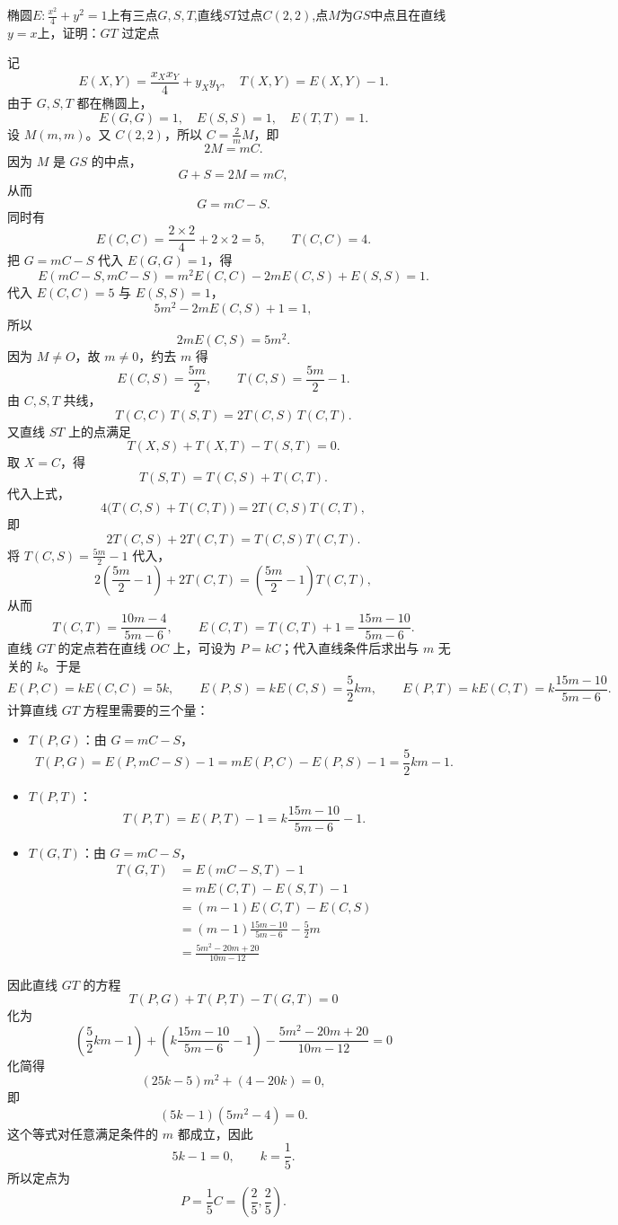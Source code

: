\begin{exercise}
椭圆$E:\frac{x^2}4+y^2=1$上有三点$G,S,T$,直线$ST$过点$C(2,2)$,点$M$为$GS$中点且在直线$y=x$上，证明：$GT$ 过定点
\end{exercise}
\begin{solution}
记
$$E(X, Y) = \frac{x_X x_Y}{4} + y_X y_Y, \quad T(X, Y) = E(X, Y) - 1.$$
由于 $G,S,T$ 都在椭圆上，
$$E(G,G)=1, \quad E(S,S)=1, \quad E(T,T)=1.$$
设 $M(m,m)$。又 $C(2,2)$，所以 $C=\frac{2}{m}M$，即
$$2M=mC.$$
因为 $M$ 是 $GS$ 的中点，
$$G+S=2M=mC,$$
从而
$$G=mC-S.$$
同时有
$$E(C,C)=\frac{2 \times 2}{4}+2 \times 2=5,\qquad T(C,C)=4.$$
把 $G=mC-S$ 代入 $E(G,G)=1$，得
$$E(mC-S,mC-S)=m^2E(C,C)-2mE(C,S)+E(S,S)=1.$$
代入 $E(C,C)=5$ 与 $E(S,S)=1$，
$$5m^2-2mE(C,S)+1=1,$$
所以
$$2mE(C,S)=5m^2.$$
因为 $M \neq O$，故 $m\neq 0$，约去 $m$ 得
$$E(C,S)=\frac{5m}{2},\qquad T(C,S)=\frac{5m}{2}-1.$$
由 $C,S,T$ 共线，
$$T(C,C)\,T(S,T)=2T(C,S)\,T(C,T).$$
又直线 $ST$ 上的点满足
$$T(X,S)+T(X,T)-T(S,T)=0.$$
取 $X=C$，得
$$T(S,T)=T(C,S)+T(C,T).$$
代入上式，
$$4\bigl(T(C,S)+T(C,T)\bigr)=2T(C,S)T(C,T),$$
即
$$2T(C,S)+2T(C,T)=T(C,S)T(C,T).$$
将 $T(C,S)=\frac{5m}{2}-1$ 代入，
$$2 \left( \frac{5m}{2} - 1 \right) + 2 T(C,T) = \left( \frac{5m}{2} - 1 \right) T(C,T),$$
从而
$$T(C,T)=\frac{10m - 4}{5m - 6},\qquad E(C,T)=T(C,T)+1=\frac{15m - 10}{5m - 6}.$$
直线 $GT$ 的定点若在直线 $OC$ 上，可设为 $P=kC$；代入直线条件后求出与 $m$ 无关的 $k$。于是
\[E(P,C) = kE(C,C) = 5k,\qquad E(P,S) = kE(C,S) = \frac{5}{2}km,\qquad E(P,T) = kE(C,T) = k\frac{15m-10}{5m-6}.\]
计算直线 $GT$ 方程里需要的三个量：
\begin{itemize}
\item $T(P,G)$：由 $G=mC-S$，
$$T(P,G)=E(P,mC-S)-1=mE(P,C)-E(P,S)-1=\frac{5}{2}km-1.$$
\item $T(P,T)$：
$$T(P,T)=E(P,T)-1=k\frac{15m-10}{5m-6}-1.$$
\item $T(G,T)$：由 $G=mC-S$，
\begin{align*}
T(G,T) &= E(mC-S,T)-1\\
&= mE(C,T)-E(S,T)-1\\
&= (m-1)E(C,T)-E(C,S)\\
&= (m-1)\frac{15m-10}{5m-6}-\frac{5}{2}m\\
&= \frac{5m^2 - 20m + 20}{10m - 12}
\end{align*}
\end{itemize}
因此直线 $GT$ 的方程
$$T(P,G) + T(P,T) - T(G,T) = 0$$
化为
$$\left( \frac{5}{2}km - 1 \right) + \left( k\frac{15m-10}{5m-6} - 1 \right) - \frac{5m^2 - 20m + 20}{10m - 12} = 0$$
化简得
$$(25k - 5)m^2 + (4 - 20k) = 0,$$
即
$$(5k - 1)(5m^2 - 4) = 0.$$
这个等式对任意满足条件的 $m$ 都成立，因此
$$5k - 1 = 0,\qquad k = \frac{1}{5}.$$
所以定点为
$$P = \frac{1}{5}C = \left(\frac{2}{5}, \frac{2}{5}\right).$$
\end{solution}

